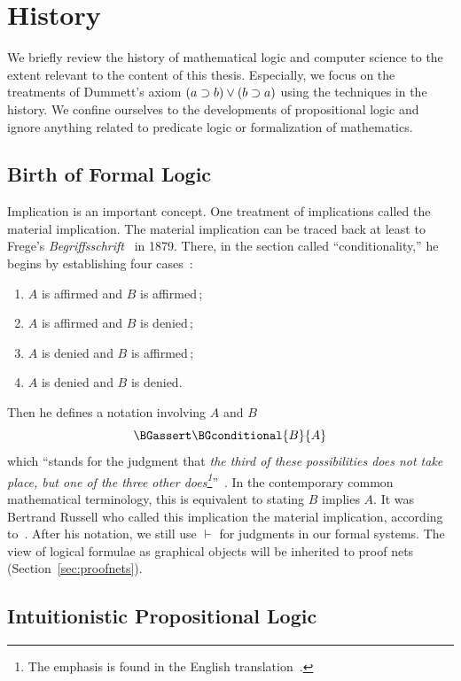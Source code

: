 \section{History}

We briefly review the history of mathematical logic and computer science
to the extent relevant to the content of this thesis.
Especially, we focus on the treatments of Dummett's axiom $(a\supset
b)\lor(b\supset a)$ using the techniques in the history.
We confine ourselves to the developments of propositional logic and
ignore anything related to predicate logic or formalization of
mathematics.

\subsection{Birth of Formal Logic}

Implication is an important concept.
One treatment of implications called the material
implication.
The material implication can be traced back at least to
Frege's \textit{Begriffsschrift}~\citep{frege} in 1879.
There, in the
section called ``conditionality,''
he begins by establishing four cases~\citep[p.~13]{frege}:
\begin{enumerate}
 \item $A$ is affirmed and $B$ is affirmed\,;
 \item $A$ is affirmed and $B$ is denied\,;
 \item $A$ is denied and $B$ is affirmed\,;
 \item $A$ is denied and $B$ is denied.
\end{enumerate}
Then he defines a notation involving $A$ and $B$
\[
\BGassert\BGconditional{B}{A}
\]
which ``stands for the
judgment that \textit{the third of these possibilities does not take
place, but one of the three other does\footnote{The emphasis is found in
the English translation~\citep[p.~14]{frege}.}}''~\citep[p.~14]{frege}.
In the contemporary common mathematical terminology, this is equivalent
to stating $B$ implies $A$.
It was Bertrand Russell who called this implication the material
implication,
according to~\citet{sep-conditionals}.
After his notation, we still use $\vdash$ for judgments in our formal
systems.
The view of logical formulae as graphical objects
will be inherited to proof nets (Section~\ref{sec:proofnets}).

\subsection{Intuitionistic Propositional Logic}

